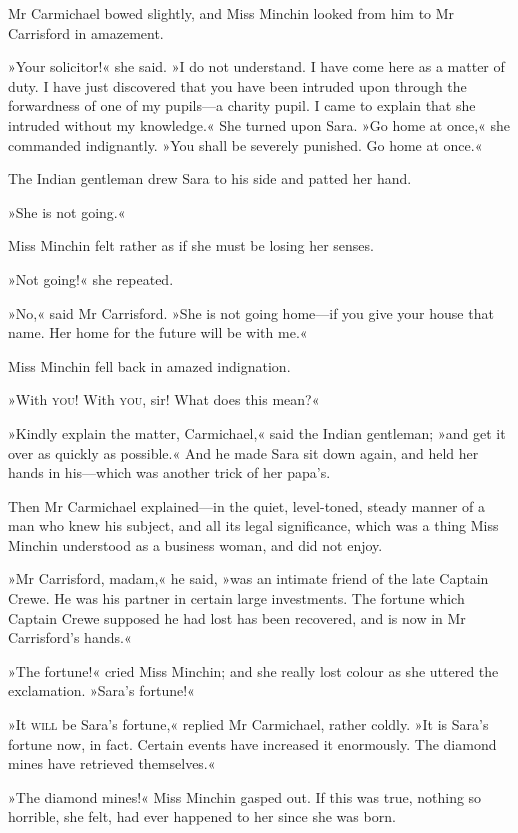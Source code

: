 Mr Carmichael bowed slightly, and Miss Minchin looked from him to Mr Carrisford in amazement.

»Your solicitor!« she said. »I do not understand. I have come here as a matter of duty. I have just discovered that you have been intruded upon through the forwardness of one of my pupils—a charity pupil. I came to explain that she intruded without my knowledge.« She turned upon Sara. »Go home at once,« she commanded indignantly. »You shall be severely punished. Go home at once.«

The Indian gentleman drew Sara to his side and patted her hand.

»She is not going.«

Miss Minchin felt rather as if she must be losing her senses.

»Not going!« she repeated.

»No,« said Mr Carrisford. »She is not going home—if you give your house that name. Her home for the future will be with me.«

Miss Minchin fell back in amazed indignation.

»With \textsc{you}! With \textsc{you,} sir! What does this mean?«

»Kindly explain the matter, Carmichael,« said the Indian gentleman; »and get it over as quickly as possible.« And he made Sara sit down again, and held her hands in his—which was another trick of her papa's.

Then Mr Carmichael explained—in the quiet, level-toned, steady manner of a man who knew his subject, and all its legal significance, which was a thing Miss Minchin understood as a business woman, and did not enjoy.

»Mr Carrisford, madam,« he said, »was an intimate friend of the late Captain Crewe. He was his partner in certain large investments. The fortune which Captain Crewe supposed he had lost has been recovered, and is now in Mr Carrisford's hands.«

»The fortune!« cried Miss Minchin; and she really lost colour as she uttered the exclamation. »Sara's fortune!«

»It \textsc{will} be Sara's fortune,« replied Mr Carmichael, rather coldly. »It is Sara's fortune now, in fact. Certain events have increased it enormously. The diamond mines have retrieved themselves.«

»The diamond mines!« Miss Minchin gasped out. If this was true, nothing so horrible, she felt, had ever happened to her since she was born.

